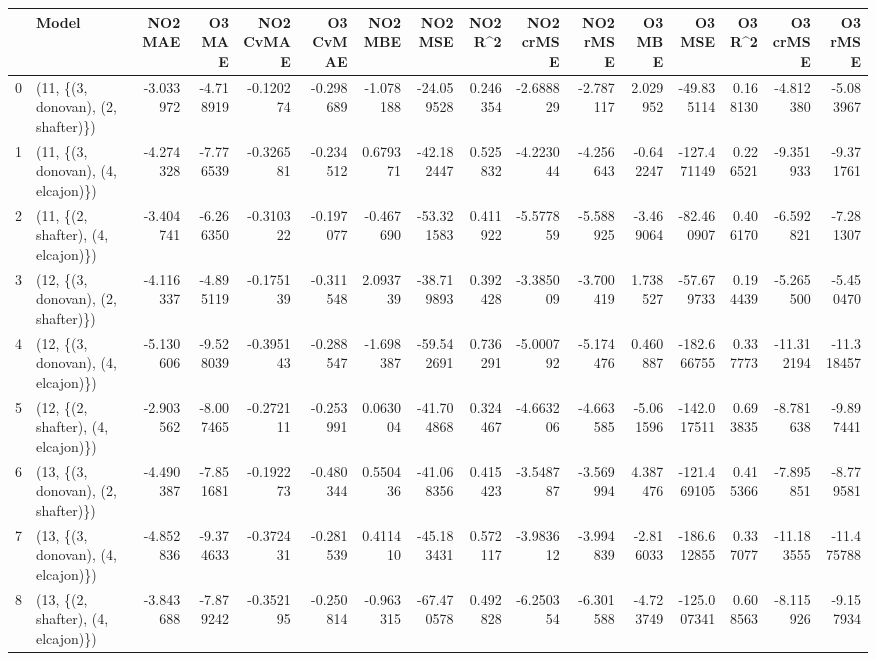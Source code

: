\begin{tabular}{llrrrrrrrrrrrrrr}
\toprule
{} &                               Model &   NO2 MAE &     O3 MAE &  NO2 CvMAE &  O3 CvMAE &   NO2 MBE &     NO2 MSE &   NO2 R\textasciicircum2 &  NO2 crMSE &   NO2 rMSE &    O3 MBE &      O3 MSE &    O3 R\textasciicircum2 &   O3 crMSE &    O3 rMSE \\
\midrule
0  &  (11, \{(3, donovan), (2, shafter)\}) & -3.033972 &  -4.718919 &  -0.120274 & -0.298689 & -1.078188 &  -24.059528 &  0.246354 &  -2.688829 &  -2.787117 &  2.029952 &  -49.835114 &  0.168130 &  -4.812380 &  -5.083967 \\
1  &  (11, \{(3, donovan), (4, elcajon)\}) & -4.274328 &  -7.776539 &  -0.326581 & -0.234512 &  0.679371 &  -42.182447 &  0.525832 &  -4.223044 &  -4.256643 & -0.642247 & -127.471149 &  0.226521 &  -9.351933 &  -9.371761 \\
2  &  (11, \{(2, shafter), (4, elcajon)\}) & -3.404741 &  -6.266350 &  -0.310322 & -0.197077 & -0.467690 &  -53.321583 &  0.411922 &  -5.577859 &  -5.588925 & -3.469064 &  -82.460907 &  0.406170 &  -6.592821 &  -7.281307 \\
3  &  (12, \{(3, donovan), (2, shafter)\}) & -4.116337 &  -4.895119 &  -0.175139 & -0.311548 &  2.093739 &  -38.719893 &  0.392428 &  -3.385009 &  -3.700419 &  1.738527 &  -57.679733 &  0.194439 &  -5.265500 &  -5.450470 \\
4  &  (12, \{(3, donovan), (4, elcajon)\}) & -5.130606 &  -9.528039 &  -0.395143 & -0.288547 & -1.698387 &  -59.542691 &  0.736291 &  -5.000792 &  -5.174476 &  0.460887 & -182.666755 &  0.337773 & -11.312194 & -11.318457 \\
5  &  (12, \{(2, shafter), (4, elcajon)\}) & -2.903562 &  -8.007465 &  -0.272111 & -0.253991 &  0.063004 &  -41.704868 &  0.324467 &  -4.663206 &  -4.663585 & -5.061596 & -142.017511 &  0.693835 &  -8.781638 &  -9.897441 \\
6  &  (13, \{(3, donovan), (2, shafter)\}) & -4.490387 &  -7.851681 &  -0.192273 & -0.480344 &  0.550436 &  -41.068356 &  0.415423 &  -3.548787 &  -3.569994 &  4.387476 & -121.469105 &  0.415366 &  -7.895851 &  -8.779581 \\
7  &  (13, \{(3, donovan), (4, elcajon)\}) & -4.852836 &  -9.374633 &  -0.372431 & -0.281539 &  0.411410 &  -45.183431 &  0.572117 &  -3.983612 &  -3.994839 & -2.816033 & -186.612855 &  0.337077 & -11.183555 & -11.475788 \\
8  &  (13, \{(2, shafter), (4, elcajon)\}) & -3.843688 &  -7.879242 &  -0.352195 & -0.250814 & -0.963315 &  -67.470578 &  0.492828 &  -6.250354 &  -6.301588 & -4.723749 & -125.007341 &  0.608563 &  -8.115926 &  -9.157934 \\

\end{tabular}
